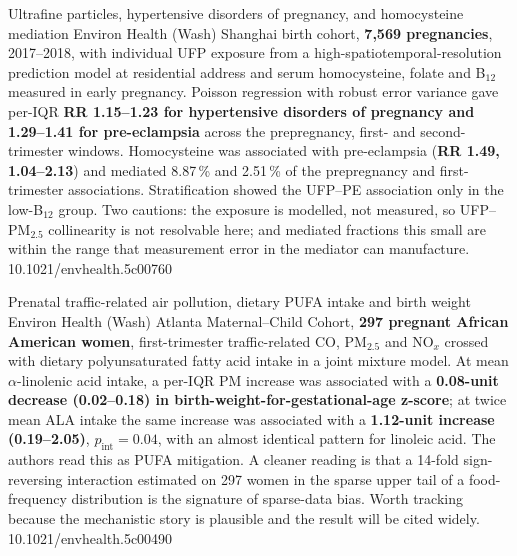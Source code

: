 \documentclass[10pt]{article}
\begin{document}
{Ultrafine particles, hypertensive disorders of pregnancy, and homocysteine mediation}
{Environ Health (Wash)}
{Shanghai birth cohort, \textbf{7,569 pregnancies}, 2017--2018, with individual UFP
exposure from a high-spatiotemporal-resolution prediction model at residential address
and serum homocysteine, folate and B$_{12}$ measured in early pregnancy. Poisson
regression with robust error variance gave per-IQR \textbf{RR 1.15--1.23 for
hypertensive disorders of pregnancy and 1.29--1.41 for pre-eclampsia} across the
prepregnancy, first- and second-trimester windows. Homocysteine was associated with
pre-eclampsia (\textbf{RR 1.49, 1.04--2.13}) and mediated 8.87\,\% and 2.51\,\% of the
prepregnancy and first-trimester associations. Stratification showed the UFP--PE
association only in the low-B$_{12}$ group. Two cautions: the exposure is modelled, not
measured, so UFP--PM$_{2.5}$ collinearity is not resolvable here; and mediated fractions
this small are within the range that measurement error in the mediator can manufacture.}
{10.1021/envhealth.5c00760}

{Prenatal traffic-related air pollution, dietary PUFA intake and birth weight}
{Environ Health (Wash)}
{Atlanta Maternal--Child Cohort, \textbf{297 pregnant African American women},
first-trimester traffic-related CO, PM$_{2.5}$ and NO$_x$ crossed with dietary
polyunsaturated fatty acid intake in a joint mixture model. At mean $\alpha$-linolenic
acid intake, a per-IQR PM increase was associated with a \textbf{0.08-unit decrease
(0.02--0.18) in birth-weight-for-gestational-age z-score}; at twice mean ALA intake the
same increase was associated with a \textbf{1.12-unit increase (0.19--2.05)},
$p_{\mathrm{int}}=0.04$, with an almost identical pattern for linoleic acid. The authors
read this as PUFA mitigation. A cleaner reading is that a 14-fold sign-reversing
interaction estimated on 297 women in the sparse upper tail of a food-frequency
distribution is the signature of sparse-data bias. Worth tracking because the
mechanistic story is plausible and the result will be cited widely.}
{10.1021/envhealth.5c00490}

\end{document}
